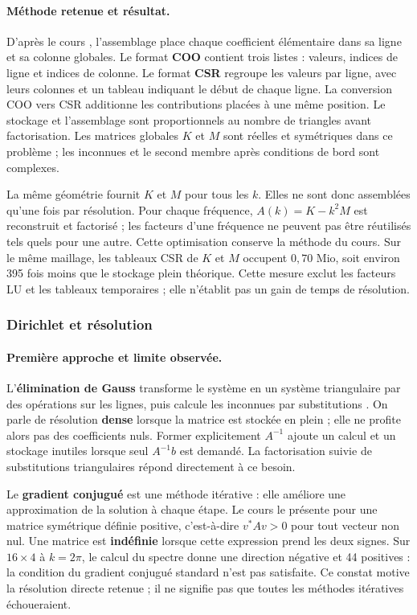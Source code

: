 \documentclass[12pt,a4paper]{article}
\begin{document}
\paragraph{Méthode retenue et résultat.}
D'après le cours \cite{fem}, l'assemblage place chaque coefficient élémentaire dans sa ligne et sa colonne globales. Le format \textbf{COO} contient trois listes : valeurs, indices de ligne et indices de colonne. Le format \textbf{CSR} regroupe les valeurs par ligne, avec leurs colonnes et un tableau indiquant le début de chaque ligne. La conversion COO vers CSR additionne les contributions placées à une même position. Le stockage et l'assemblage sont proportionnels au nombre de triangles avant factorisation. Les matrices globales $K$ et $M$ sont réelles et symétriques dans ce problème ; les inconnues et le second membre après conditions de bord sont complexes.

La même géométrie fournit $K$ et $M$ pour tous les $k$. Elles ne sont donc assemblées qu'une fois par résolution. Pour chaque fréquence, $A(k)=K-k^2M$ est reconstruit et factorisé ; les facteurs d'une fréquence ne peuvent pas être réutilisés tels quels pour une autre. Cette optimisation conserve la méthode du cours. Sur le même maillage, les tableaux CSR de $K$ et $M$ occupent $0,70$ Mio, soit environ 395 fois moins que le stockage plein théorique. Cette mesure exclut les facteurs LU et les tableaux temporaires ; elle n'établit pas un gain de temps de résolution.

\subsubsection{Dirichlet et résolution}
\paragraph{Première approche et limite observée.}
L'\textbf{élimination de Gauss} transforme le système en un système triangulaire par des opérations sur les lignes, puis calcule les inconnues par substitutions \cite{linear}. On parle de résolution \textbf{dense} lorsque la matrice est stockée en plein ; elle ne profite alors pas des coefficients nuls. Former explicitement $A^{-1}$ ajoute un calcul et un stockage inutiles lorsque seul $A^{-1}b$ est demandé. La factorisation suivie de substitutions triangulaires répond directement à ce besoin.

Le \textbf{gradient conjugué} est une méthode itérative : elle améliore une approximation de la solution à chaque étape. Le cours \cite{linear} le présente pour une matrice symétrique définie positive, c'est-à-dire $v^*Av>0$ pour tout vecteur non nul. Une matrice est \textbf{indéfinie} lorsque cette expression prend les deux signes. Sur $16\times4$ à $k=2\pi$, le calcul du spectre donne une direction négative et 44 positives : la condition du gradient conjugué standard n'est pas satisfaite. Ce constat motive la résolution directe retenue ; il ne signifie pas que toutes les méthodes itératives échoueraient.
\end{document}
